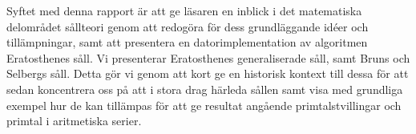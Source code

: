 Syftet med denna rapport är att ge läsaren en inblick i det matematiska delområdet sållteori genom att redogöra för dess grundläggande idéer och tillämpningar, samt att presentera en datorimplementation av algoritmen Eratosthenes såll. 
Vi presenterar Eratosthenes generaliserade såll, samt Bruns och Selbergs såll.
Detta gör vi genom att kort ge en historisk kontext till dessa för att sedan koncentrera oss på att i stora drag härleda sållen samt visa med grundliga exempel hur de kan tillämpas för att ge resultat angående primtalstvillingar och primtal i aritmetiska serier.


